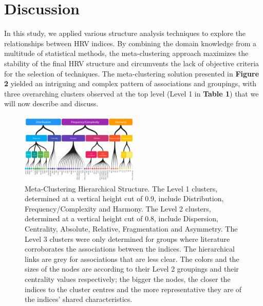 \documentclass[
  english,
  jou,floatsintext]{apa6}
\begin{document}
\hypertarget{discussion}{%
\section{Discussion}\label{discussion}}

In this study, we applied various structure analysis techniques to explore the relationships between HRV indices. By combining the domain knowledge from a multitude of statistical methods, the meta-clustering approach maximizes the stability of the final HRV structure and circumvents the lack of objective criteria for the selection of techniques. The meta-clustering solution presented in \textbf{Figure 2} yielded an intriguing and complex pattern of associations and groupings, with three overarching clusters observed at the top level (Level 1 in \textbf{Table 1}) that we will now describe and discuss.

\begin{figure}

{\centering \includegraphics[width=0.5\textwidth]{figures/figure_dendrogram} 

}

\caption{Meta-Clustering Hierarchical Structure. The Level 1 clusters, determined at a vertical height cut of 0.9, include Distribution, Frequency/Complexity and Harmony. The Level 2 clusters, determined at a vertical height cut of 0.8, include Dispersion, Centrality, Absolute, Relative, Fragmentation and Asymmetry. The Level 3 clusters were only determined for groups where literature corroborates the associations between the indices. The hierarchical links are grey for associations that are less clear. The colors and the sizes of the nodes are according to their Level 2 groupings and their centrality values respectively; the bigger the nodes, the closer the indices to the cluster centres and the more representative they are of the indices' shared characteristics.}\label{fig:Figure2}
\end{figure}
\end{document}
